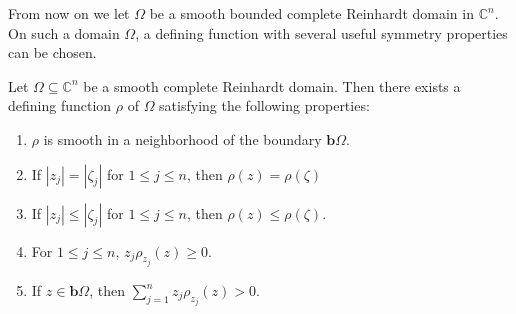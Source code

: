 \documentclass[reqno,12pt]{amsart}
\numberwithin{equation}{section}
\begin{document}
			From now on we let $\Omega$ be a smooth bounded {complete Reinhardt} domain in $\mathbb C^n$. 	
			On such a domain $\Omega$, a defining function with {several useful symmetry properties} can be chosen.
			\begin{lem}
				Let $\Omega\subseteq\mathbb C^n$ be a smooth {complete Reinhardt} domain.   Then there exists a defining function $\rho$ of $\Omega$ satisfying the following properties: 
				\begin{enumerate}[label=(\alph*)]
					\item $\rho$ is smooth in a neighborhood of the boundary $\mathbf b \Omega$.
					\item   If $|z_j|=|\zeta_j|$ for $1\leq j\leq n$, then $\rho(z )=\rho(\zeta )$ 
					\item If $|z_j|\leq|\zeta_j|$ for $1\leq j\leq n$, then $\rho(z )\leq \rho(\zeta )$.
					\item For $1\leq j\leq n$, $z_j\rho_{z_j}(z)\geq0$.
					\item If $z\in \mathbf b\Omega$, then $\sum_{j=1}^{n}z_j\rho_{z_j}(z)>0$.
				\end{enumerate}
			\end{lem}
\end{document}
